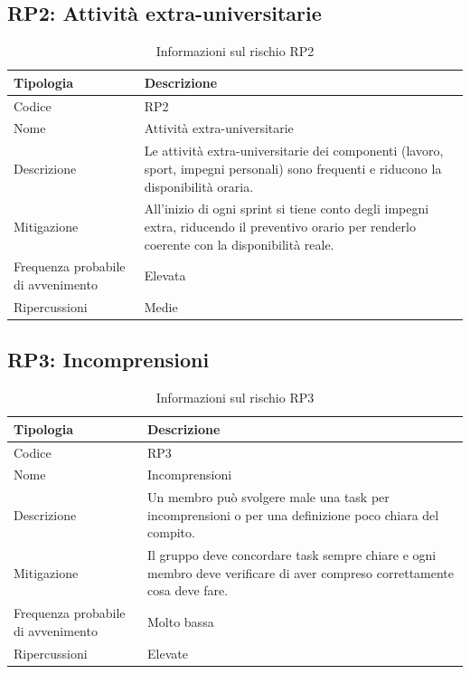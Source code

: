 \documentclass[a4paper, 11pt]{article}
\begin{document}
\subsection{RP2: Attività extra-universitarie}
\begin{table}[H]
\centering
\begin{tabularx}{\textwidth}{|l|X|}
    \hline
    \textbf{Tipologia} & \textbf{Descrizione} \\ \hline
    Codice & RP2 \\ \hline
    Nome & Attività extra-universitarie \\ \hline
    Descrizione & Le attività extra-universitarie dei componenti (lavoro, sport, impegni personali) sono frequenti e riducono la disponibilità oraria. \\ \hline
    Mitigazione & All'inizio di ogni sprint si tiene conto degli impegni extra, riducendo il preventivo orario per renderlo coerente con la disponibilità reale. \\ \hline
    Frequenza probabile di avvenimento & Elevata \\ \hline
    Ripercussioni & Medie \\ \hline
\end{tabularx}
\caption{Informazioni sul rischio RP2}
\end{table}

\subsection{RP3: Incomprensioni}
\begin{table}[H]
\centering
\begin{tabularx}{\textwidth}{|l|X|}
    \hline
    \textbf{Tipologia} & \textbf{Descrizione} \\ \hline
    Codice & RP3 \\ \hline
    Nome & Incomprensioni \\ \hline
    Descrizione & Un membro può svolgere male una task per incomprensioni o per una definizione poco chiara del compito. \\ \hline
    Mitigazione & Il gruppo deve concordare task sempre chiare e ogni membro deve verificare di aver compreso correttamente cosa deve fare. \\ \hline
    Frequenza probabile di avvenimento & Molto bassa \\ \hline
    Ripercussioni & Elevate \\ \hline
\end{tabularx}
\caption{Informazioni sul rischio RP3}
\end{table}
\end{document}
